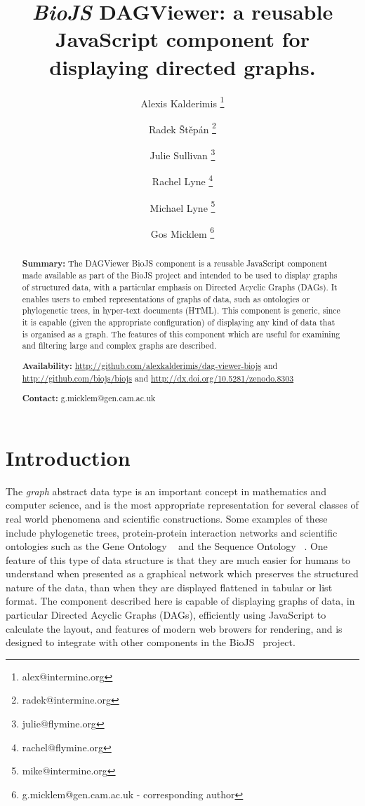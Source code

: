 \documentclass[10pt,a4paper,twocolumn]{article}
\begin{document}
\title{\textit{BioJS} DAGViewer:
  a reusable JavaScript component for displaying directed graphs.
}

\author[1]{Alexis Kalderimis \thanks{alex@intermine.org}}
\author[1]{Radek Štěpán \thanks{radek@intermine.org}}
\author[1]{Julie Sullivan \thanks{julie@flymine.org}}
\author[1]{Rachel Lyne \thanks{rachel@flymine.org}}
\author[1]{Michael Lyne \thanks{mike@intermine.org}}
\author[1]{Gos Micklem \thanks{g.micklem@gen.cam.ac.uk - corresponding author}}

\maketitle
\thispagestyle{fancy}


\begin{abstract}

\textbf{Summary:}
The DAGViewer BioJS component is a reusable JavaScript component made available
as part of the BioJS project and intended to be used to display graphs of
structured data, with a particular emphasis on Directed Acyclic Graphs (DAGs).
It enables users to embed representations of graphs of data, such as ontologies
or phylogenetic trees, in hyper-text documents (HTML).  This component is
generic, since it is capable (given the appropriate configuration) of displaying
any kind of data that is organised as a graph.  The features of this component
which are useful for examining and filtering large and complex graphs are
described.

\textbf{Availability:}
\url{http://github.com/alexkalderimis/dag-viewer-biojs} and
\url{http://github.com/biojs/biojs} and
\url{http://dx.doi.org/10.5281/zenodo.8303}

\textbf{Contact:} g.micklem@gen.cam.ac.uk

\end{abstract}
\clearpage

\section*{Introduction}

The \emph{graph} abstract data type is an important concept in mathematics and
computer science, and is the most appropriate representation for several classes
of real world phenomena and scientific constructions. Some examples of these
include phylogenetic trees, protein-protein interaction networks and scientific
ontologies such as the Gene Ontology ~\cite{GO} and the Sequence Ontology
~\cite{SO}. One feature of this type of data structure is that they are much
easier for humans to understand when presented as a graphical network which
preserves the structured nature of the data, than when they are displayed
flattened in tabular or list format. The component described here is capable of
displaying graphs of data, in particular Directed Acyclic Graphs (DAGs),
efficiently using JavaScript to calculate the layout, and features of modern
web browers for rendering, and is designed to integrate with other components in
the BioJS~\cite{biojs} project.
\end{document}
